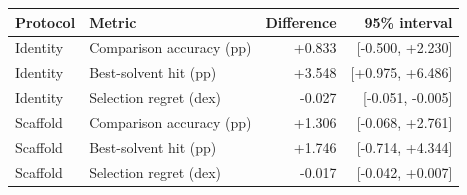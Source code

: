 \begingroup\footnotesize
\setlength{\tabcolsep}{3pt}
\begin{tabular}{llrr}
\toprule
Protocol & Metric & Difference & 95\% interval \\
\midrule
Identity & Comparison accuracy (pp) & +0.833 & [-0.500, +2.230] \\
Identity & Best-solvent hit (pp) & +3.548 & [+0.975, +6.486] \\
Identity & Selection regret (dex) & -0.027 & [-0.051, -0.005] \\
Scaffold & Comparison accuracy (pp) & +1.306 & [-0.068, +2.761] \\
Scaffold & Best-solvent hit (pp) & +1.746 & [-0.714, +4.344] \\
Scaffold & Selection regret (dex) & -0.017 & [-0.042, +0.007] \\
\bottomrule
\end{tabular}
\endgroup
